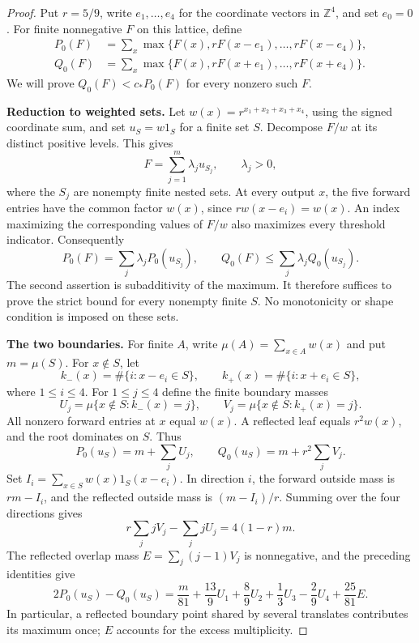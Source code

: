 \begin{proof}
Put $r=5/9$, write $e_1,\ldots,e_4$ for the coordinate vectors in
$\mathbb Z^4$, and set $e_0=0$. For finite nonnegative $F$ on this
lattice, define
\[
\begin{aligned}
 P_0(F)&=\sum_x\max\{F(x),rF(x-e_1),\ldots,rF(x-e_4)\},\\
 Q_0(F)&=\sum_x\max\{F(x),rF(x+e_1),\ldots,rF(x+e_4)\}.
\end{aligned}
\]
We will prove $Q_0(F)<c_*P_0(F)$ for every nonzero such $F$.

\medskip\noindent\textbf{Reduction to weighted sets.}
Let $w(x)=r^{x_1+x_2+x_3+x_4}$, using the signed coordinate sum,
and set $u_S=w1_S$ for a finite set $S$. Decompose $F/w$ at its
distinct positive levels. This gives
\[
 F=\sum_{j=1}^m\lambda_j u_{S_j},\qquad \lambda_j>0,
\]
where the $S_j$ are nonempty finite nested sets. At every output $x$,
the five forward entries have the common factor $w(x)$, since
$rw(x-e_i)=w(x)$. An index maximizing the corresponding values of
$F/w$ also maximizes every threshold indicator. Consequently
\begin{equation}\label{eq:five-profile-layer-reduction}
 P_0(F)=\sum_j\lambda_jP_0(u_{S_j}),\qquad
 Q_0(F)\le\sum_j\lambda_jQ_0(u_{S_j}).
\end{equation}
The second assertion is subadditivity of the maximum. It therefore
suffices to prove the strict bound for every nonempty finite $S$.
No monotonicity or shape condition is imposed on these sets.

\medskip\noindent\textbf{The two boundaries.}
For finite $A$, write $\mu(A)=\sum_{x\in A}w(x)$ and put $m=\mu(S)$.
For $x\notin S$, let
\[
 k_-(x)=\#\{i:x-e_i\in S\},\qquad
 k_+(x)=\#\{i:x+e_i\in S\},
\]
where $1\le i\le4$. For $1\le j\le4$ define the finite boundary masses
\[
 U_j=\mu\{x\notin S:k_-(x)=j\},\qquad
 V_j=\mu\{x\notin S:k_+(x)=j\}.
\]
All nonzero forward entries at $x$ equal $w(x)$. A reflected leaf
equals $r^2w(x)$, and the root dominates on $S$. Thus
\[
 P_0(u_S)=m+\sum_jU_j,\qquad Q_0(u_S)=m+r^2\sum_jV_j.
\]
Set $I_i=\sum_{x\in S}w(x)1_S(x-e_i)$. In direction $i$, the
forward outside mass is $rm-I_i$, and the reflected outside mass
is $(m-I_i)/r$. Summing over the four directions gives
\[
 r\sum_jjV_j-\sum_jjU_j=4(1-r)m.
\]
The reflected overlap mass $E=\sum_j(j-1)V_j$ is nonnegative, and
the preceding identities give
\begin{equation}\label{eq:five-profile-boundaries}
 2P_0(u_S)-Q_0(u_S)
 =\frac{m}{81}+\frac{13}{9}U_1+\frac89U_2+\frac13U_3
       -\frac29U_4+\frac{25}{81}E.
\end{equation}
In particular, a reflected boundary point shared by several translates
contributes its maximum once; $E$ accounts for the excess multiplicity.


\end{proof}
